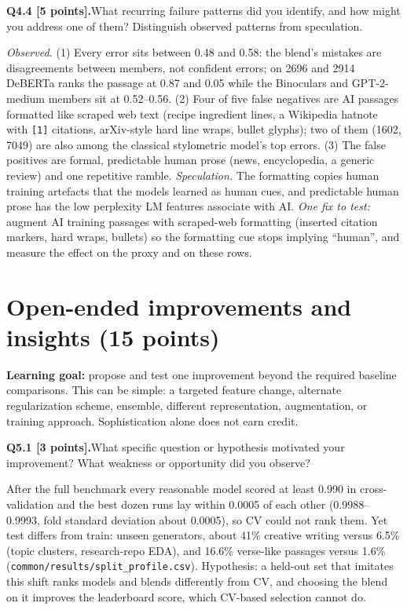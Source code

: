 \documentclass[11pt,letterpaper]{article}
\newcommand{\question}[2]{\needspace{4\baselineskip}\par\addvspace{0.45em}\noindent\textbf{#1}\quad #2\par\nobreak\vspace{0.1em}}
\begin{document}
\question{Q4.4 [5 points].}{What recurring failure patterns did you identify, and how might you address one of them? Distinguish observed patterns from speculation.}
\textit{Observed.} (1) Every error sits between 0.48 and 0.58: the blend's mistakes are disagreements between members, not confident errors; on 2696 and 2914 DeBERTa ranks the passage at 0.87 and 0.05 while the Binoculars and GPT-2-medium members sit at 0.52--0.56. (2) Four of five false negatives are AI passages formatted like scraped web text (recipe ingredient lines, a Wikipedia hatnote with \texttt{[1]} citations, arXiv-style hard line wraps, bullet glyphs); two of them (1602, 7049) are also among the classical stylometric model's top errors. (3) The false positives are formal, predictable human prose (news, encyclopedia, a generic review) and one repetitive ramble. \textit{Speculation.} The formatting copies human training artefacts that the models learned as human cues, and predictable human prose has the low perplexity LM features associate with AI. \textit{One fix to test:} augment AI training passages with scraped-web formatting (inserted citation markers, hard wraps, bullets) so the formatting cue stops implying ``human'', and measure the effect on the proxy and on these rows.

\newpage
\section{Open-ended improvements and insights (15 points)}
\textbf{Learning goal:} propose and test one improvement beyond the required baseline comparisons. This can be simple: a targeted feature change, alternate regularization scheme, ensemble, different representation, augmentation, or training approach. Sophistication alone does not earn credit.

\question{Q5.1 [3 points].}{What specific question or hypothesis motivated your improvement? What weakness or opportunity did you observe?}
After the full benchmark every reasonable model scored at least 0.990 in cross-validation and the best dozen runs lay within 0.0005 of each other (0.9988--0.9993, fold standard deviation about 0.0005), so CV could not rank them. Yet test differs from train: unseen generators, about 41\% creative writing versus 6.5\% (topic clusters, research-repo EDA), and 16.6\% verse-like passages versus 1.6\% (\texttt{common/results/split\_profile.csv}). Hypothesis: a held-out set that imitates this shift ranks models and blends differently from CV, and choosing the blend on it improves the leaderboard score, which CV-based selection cannot do.
\end{document}
